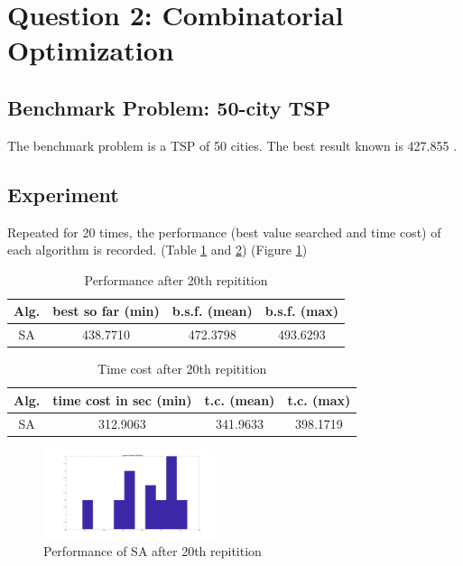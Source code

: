 \documentclass{IEEEtran}
\begin{document}
\section{Question 2: Combinatorial Optimization}
{
    \subsection{Benchmark Problem: 50-city TSP}
    {
        The benchmark problem is a TSP of 50 cities. The best result known is 427.855 \cite{book:wang}. 
    }

    \subsection{Experiment}
    {
        Repeated for 20 times, the performance (best value searched and time cost) of each algorithm is recorded. 
        (Table \ref{tab:performance_Q2} and \ref{tab:timecost_Q2})
        (Figure \ref{fig:TSP_SA})

        \begin{table}[!hbp]
            \centering
            \begin{tabular}{|c|c|c|c|}
                \hline
                Alg. & best so far (min) & b.s.f. (mean) & b.s.f. (max) \\
                \hline
                SA &  438.7710 &  472.3798 &  493.6293 \\
                \hline
            \end{tabular}
            \caption{Performance after 20th repitition}
            \label{tab:performance_Q2}
        \end{table}

        \begin{table}[!hbp]
            \centering
            \begin{tabular}{|c|c|c|c|}
                \hline
                Alg. & time cost in sec (min) & t.c. (mean) & t.c. (max) \\
                \hline
                SA &  312.9063 &  341.9633 &  398.1719 \\
                \hline
            \end{tabular}
            \caption{Time cost after 20th repitition}
            \label{tab:timecost_Q2}
        \end{table}
        
        \begin{figure}[!htbp]
            \centering
            \includegraphics[width=0.45\textwidth]{Q2/figures/TSP_SA_test.png}
            \caption{Performance of SA after 20th repitition}
            \label{fig:TSP_SA}
        \end{figure}

}}
\end{document}
